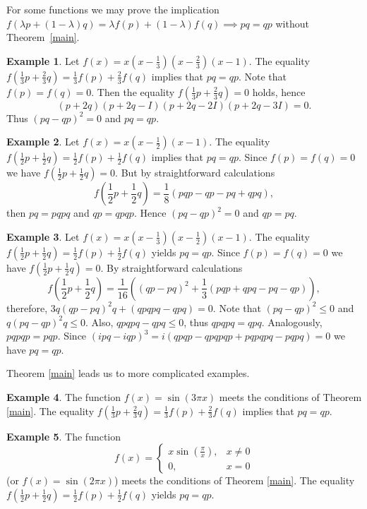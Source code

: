 \documentclass[
11pt,%
tightenlines,%
twoside,%
onecolumn,%
nofloats,%
nobibnotes,%
nofootinbib,%
superscriptaddress,%
noshowpacs,%
centertags]%
{revtex4}
\theoremstyle{definition}
\newtheorem{example}{Example} %
\begin{document}
For some functions we may prove the implication  $f(\lambda p
+(1-\lambda)q)=\lambda f(p) +(1-\lambda)f(q)\implies pq=qp$ without
Theorem~\ref{main}.

\begin{example}
Let $f(x)=x(x-\frac{1}{3})(x-\frac{2}{3})(x-1)$.
The equality $f(\frac{1}{3}p+\frac{2}{3}q)=\frac{1}{3}f(p)+\frac{2}{3}f(q)$ implies that $pq=qp$.
Note that $f(p)=f(q)=0$. Then the equality $f(\frac{1}{3}p+\frac{2}{3}q)=0$ holds,
hence
$$
(p+2q)(p+2q-I)(p+2q-2I)(p+2q-3I)=0.
$$
Thus
$(pq-qp)^2=0$ and $pq=qp$.
\end{example}

\begin{example}
Let $f(x)=x(x-\frac{1}{2})(x-1)$. The equality
$f(\frac{1}{2}p+\frac{1}{2}q)=\frac{1}{2}f(p)+\frac{1}{2}f(q)$
implies that $pq=qp$. Since $f(p)=f(q)=0$ we have
$f(\frac{1}{2}p+\frac{1}{2}q)=0$. But by straightforward
calculations
$$
f\left(\frac{1}{2}p+\frac{1}{2}q\right)=\frac{1}{8}(pqp-qp-pq+qpq),
$$
 then  $pq=pqpq$ and $qp=qpqp$. Hence
$(pq-qp)^2=0 $ and $ qp=pq$.
\end{example}

\begin{example}
Let $f(x)=x(x-\frac{1}{3})(x-\frac{1}{2})(x-1)$. The equality
$f(\frac{1}{2}p+\frac{1}{2}q)=\frac{1}{2}f(p)+\frac{1}{2}f(q)$
yields $pq=qp$. Since $f(p)=f(q)=0$ we have
$f(\frac{1}{2}p+\frac{1}{2}q)=0$. By straightforward calculations
$$
f\left(\frac{1}{2}p+\frac{1}{2}q\right)=\frac{1}{16}\left((qp-pq)^2+\frac{1}{3}(pqp+qpq-pq-qp)\right),
$$
therefore,  $3q(qp-pq)^2q+(qpqpq-qpq)=0$.
Note that
 $(pq-qp)^2\leq 0$ and $q(pq-qp)^2q\leq 0$.
Also, $qpqpq-qpq\leq 0$, thus $qpqpq=qpq$. Analogously, $pqpqp=pqp$.
Since $(ipq-iqp)^3= i(qpqp- qpqpqp + pqpqpq-pqpq)=0$ we have
 $pq=qp$.
\end{example}

Theorem \ref{main} leads us to more complicated examples.

\begin{example}
The function $f(x)=\sin(3\pi x)$ meets the conditions of Theorem \ref{main}.
The equality $f(\frac{1}{3}p+\frac{2}{3}q)=\frac{1}{3}f(p)+\frac{2}{3}f(q)$ implies that $pq=qp$.
\end{example}

\begin{example}
The function $$f(x)=\begin{cases}
                     x\sin(\frac{\pi}{x}),& x\neq 0 \\
                     0,& x=0
                    \end{cases}$$
(or  $f(x)=\sin(2\pi x)$) meets the conditions of Theorem \ref{main}.
The equality $f(\frac{1}{2}p+\frac{1}{2}q)=\frac{1}{2}f(p)+\frac{1}{2}f(q)$ yields $pq=qp$.
\end{example}
\end{document}
